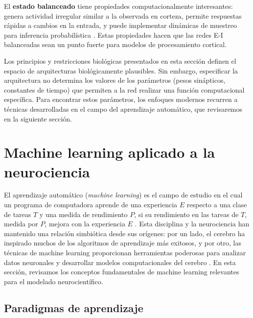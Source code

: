 El \textbf{estado balanceado} tiene propiedades computacionalmente interesantes: genera actividad irregular similar a la observada en corteza, permite respuestas rápidas a cambios en la entrada, y puede implementar dinámicas de muestreo para inferencia probabilística \citep{echeveste2020cortical}. Estas propiedades hacen que las redes E-I balanceadas sean un punto fuerte para modelos de procesamiento cortical.

\medskip

Los principios y restricciones biológicas presentados en esta sección definen el espacio de arquitecturas biológicamente plausibles. Sin embargo, especificar la arquitectura no determina los valores de los parámetros (pesos sinápticos, constantes de tiempo) que permiten a la red realizar una función computacional específica. Para encontrar estos parámetros, los enfoques modernos recurren a técnicas desarrolladas en el campo del aprendizaje automático, que revisaremos en la siguiente sección.


\section{Machine learning aplicado a la neurociencia}
\label{sec:machine_learning}

El aprendizaje automático (\textit{machine learning}) es el campo de estudio en el cual un programa de computadora aprende de una experiencia $E$ respecto a una clase de tareas $T$ y una medida de rendimiento $P$, si su rendimiento en las tareas de $T$, medida por $P$, mejora con la experiencia $E$ \citep{mitchell1997machine}. Esta disciplina y la neurociencia han mantenido una relación simbiótica desde sus orígenes: por un lado, el cerebro ha inspirado muchos de los algoritmos de aprendizaje más exitosos, y por otro, las técnicas de machine learning proporcionan herramientas poderosas para analizar datos neuronales y desarrollar modelos computacionales del cerebro \citep{heaton2018ian}. En esta sección, revisamos los conceptos fundamentales de machine learning relevantes para el modelado neurocientífico.

\subsection{Paradigmas de aprendizaje}
\label{subsec:paradigmas_aprendizaje}

